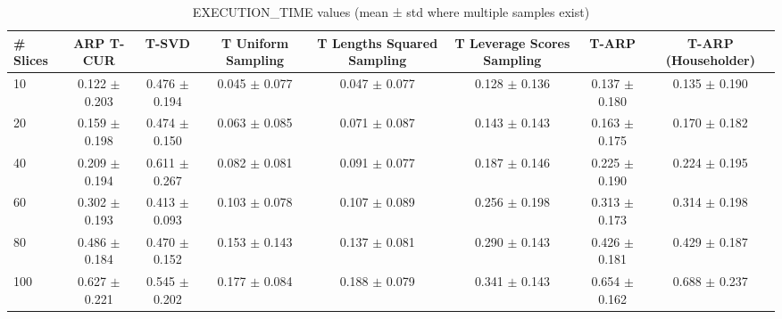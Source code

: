 \begin{table}
\caption{EXECUTION_TIME values (mean ± std where multiple samples exist)}
\label{tab:execution_time}
\begin{tabular}{lccccccc}
\toprule
# Slices & ARP T-CUR & T-SVD & T Uniform Sampling & T Lengths Squared Sampling & T Leverage Scores Sampling & T-ARP & T-ARP (Householder) \\
\midrule
10 & 0.122 $\pm$ 0.203 & 0.476 $\pm$ 0.194 & 0.045 $\pm$ 0.077 & 0.047 $\pm$ 0.077 & 0.128 $\pm$ 0.136 & 0.137 $\pm$ 0.180 & 0.135 $\pm$ 0.190 \\
20 & 0.159 $\pm$ 0.198 & 0.474 $\pm$ 0.150 & 0.063 $\pm$ 0.085 & 0.071 $\pm$ 0.087 & 0.143 $\pm$ 0.143 & 0.163 $\pm$ 0.175 & 0.170 $\pm$ 0.182 \\
40 & 0.209 $\pm$ 0.194 & 0.611 $\pm$ 0.267 & 0.082 $\pm$ 0.081 & 0.091 $\pm$ 0.077 & 0.187 $\pm$ 0.146 & 0.225 $\pm$ 0.190 & 0.224 $\pm$ 0.195 \\
60 & 0.302 $\pm$ 0.193 & 0.413 $\pm$ 0.093 & 0.103 $\pm$ 0.078 & 0.107 $\pm$ 0.089 & 0.256 $\pm$ 0.198 & 0.313 $\pm$ 0.173 & 0.314 $\pm$ 0.198 \\
80 & 0.486 $\pm$ 0.184 & 0.470 $\pm$ 0.152 & 0.153 $\pm$ 0.143 & 0.137 $\pm$ 0.081 & 0.290 $\pm$ 0.143 & 0.426 $\pm$ 0.181 & 0.429 $\pm$ 0.187 \\
100 & 0.627 $\pm$ 0.221 & 0.545 $\pm$ 0.202 & 0.177 $\pm$ 0.084 & 0.188 $\pm$ 0.079 & 0.341 $\pm$ 0.143 & 0.654 $\pm$ 0.162 & 0.688 $\pm$ 0.237 \\
\bottomrule
\end{tabular}
\end{table}
